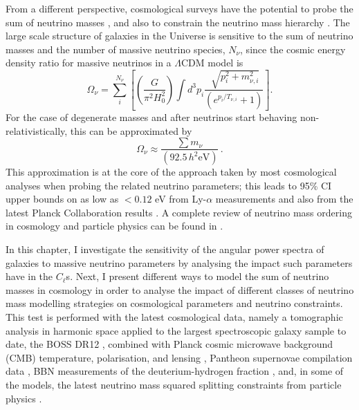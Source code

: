 \qquad From a different perspective, cosmological surveys have the potential to probe the sum of neutrino masses \citep{2007FBA,Thomas2010Neutr}, and also to constrain the neutrino mass hierarchy \citep{2003HannestadNeutrino,2016JCAP...11..035H}. The large scale structure of galaxies in the Universe is sensitive to the sum of neutrino masses and the number of massive neutrino species, $N_{\nu}$, since the cosmic energy density ratio for massive neutrinos in a $\Lambda$CDM model is
\begin{equation}
\label{Eq:NeutrinoOmega}
    \Omega_{\nu} = \sum_i^{N_{\nu}}\left[\left(\frac{G}{\pi^2H_0^2}\right)\int d^3p_i \frac{\sqrt[]{p_i^2 + m_{\nu,i}^2}}{(e^{p_i/T_{\nu,i}} + 1)} \right].
\end{equation} 
\noindent For the case of degenerate masses and after neutrinos start behaving non-relativistically, this can be approximated by \citep{Thomas2010Neutr}
\begin{equation}
    \Omega_{\nu} \approx \frac{\sum m_{\nu}}{(92.5\, h^2\text{eV})}\, .
\end{equation}
This approximation is at the core of the approach taken by most cosmological analyses when probing the related neutrino parameters; this leads to  95\% CI upper bounds on \NM{} as low as $< 0.12$ eV from Ly-$\alpha$ measurements \citep{2015PalanqueLyman-Alpha} and also from the latest Planck Collaboration results \citep{2018PlanckCosmology}. A complete review of neutrino mass ordering in cosmology and particle physics can be found in \cite{2012Julien-Deg,2018MassOrderingReview}.

\qquad In this chapter, I investigate the sensitivity of the angular power spectra of galaxies to massive neutrino parameters by analysing the impact such parameters have in the $C_{\ell}$s. Next, I present different ways to model the sum of neutrino masses in cosmology in order to analyse the impact of different classes of neutrino mass modelling strategies on cosmological parameters and neutrino constraints. This test is performed with the latest cosmological data, namely a tomographic analysis in harmonic space applied to the largest spectroscopic galaxy sample to date, the BOSS DR12 \citep[][-- also presented in Chapter \ref{Chap:BOSS}]{2018LoureiroBOSS}, combined with Planck cosmic microwave background (CMB) temperature, polarisation, and lensing \citep{PlanckCosmology2016}, Pantheon supernovae compilation data \citep{2018Pantheon}, BBN measurements of the deuterium-hydrogen fraction \citep{2018BBN-Measurements}, and, in some of the models, the latest neutrino mass squared splitting constraints from particle physics \citep{2014Gonzalez-GarciaNeutrino}.


